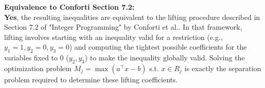 \documentclass{article} %
\begin{document}
        \textbf{Equivalence to Conforti Section 7.2:} \\
        \textbf{Yes}, the resulting inequalities are equivalent to the lifting procedure described in Section 7.2 of "Integer Programming" by Conforti et al..
        In that framework, lifting involves starting with an inequality valid for a restriction (e.g., $y_1=1, y_2=0, y_3=0$) and computing the tightest possible coefficients for the variables fixed to 0 ($y_2, y_3$) to make the inequality globally valid. Solving the optimization problem $M_j = \max (a^\top x - b)$ s.t. $x \in R_j$ is exactly the separation problem required to determine these lifting coefficients.
\end{document}
